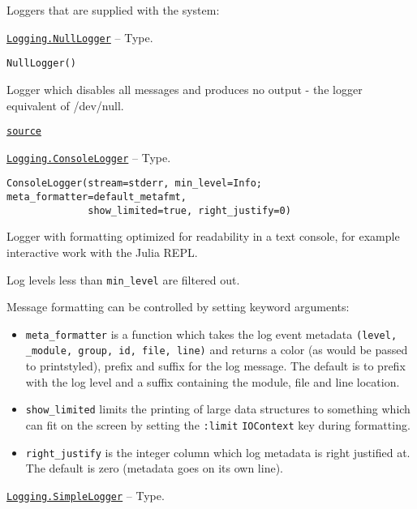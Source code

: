 Loggers that are supplied with the system:


\hypertarget{15508205197393226825}{}
\hyperlink{15508205197393226825}{\texttt{Logging.NullLogger}}  -- {Type.}

\begin{adjustwidth}{2em}{0pt}


\begin{verbatim}
NullLogger()
\end{verbatim}

Logger which disables all messages and produces no output - the logger equivalent of /dev/null.



\href{https://github.com/JuliaLang/julia/blob/9058264a69f9efc1af805c4473c946f87859b731/base/logging.jl#L93-L98}{\texttt{source}}


\end{adjustwidth}
\hypertarget{14105182192150729642}{}
\hyperlink{14105182192150729642}{\texttt{Logging.ConsoleLogger}}  -- {Type.}

\begin{adjustwidth}{2em}{0pt}


\begin{verbatim}
ConsoleLogger(stream=stderr, min_level=Info; meta_formatter=default_metafmt,
              show_limited=true, right_justify=0)
\end{verbatim}

Logger with formatting optimized for readability in a text console, for example interactive work with the Julia REPL.

Log levels less than \texttt{min\_level} are filtered out.

Message formatting can be controlled by setting keyword arguments:

\begin{itemize}
\item \texttt{meta\_formatter} is a function which takes the log event metadata \texttt{(level, \_module, group, id, file, line)} and returns a color (as would be passed to printstyled), prefix and suffix for the log message.  The default is to prefix with the log level and a suffix containing the module, file and line location.


\item \texttt{show\_limited} limits the printing of large data structures to something which can fit on the screen by setting the \texttt{:limit} \texttt{IOContext} key during formatting.


\item \texttt{right\_justify} is the integer column which log metadata is right justified at. The default is zero (metadata goes on its own line).

\end{itemize}


\end{adjustwidth}
\hypertarget{206724342092815568}{}
\hyperlink{206724342092815568}{\texttt{Logging.SimpleLogger}}  -- {Type.}

